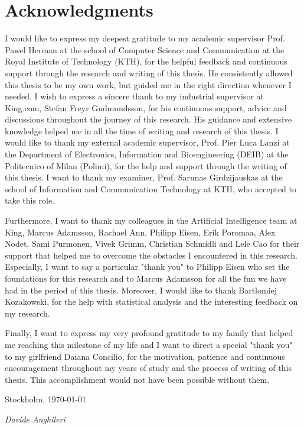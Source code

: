 \chapter*{Acknowledgments}

I would like to express my deepest gratitude to my academic supervisor Prof. Pawel Herman at the school of Computer Science and Communication at the Royal Institute of Technology (KTH), for the helpful feedback and continuous support through the research and writing of this thesis. He consistently allowed this thesis to be my own work, but guided me in the right direction whenever I needed. 
I wish to express a sincere thank to my industrial supervisor at King.com, Stefan Freyr Gudmundsson, for his continuous support, advice and discussions throughout the journey of this research. His guidance and extensive knowledge helped me in all the time of writing and research of this thesis.
I would like to thank my external academic supervisor, Prof. Pier Luca Lanzi at the Department of Electronics, Information and Bioengineering (DEIB) at the Politecnico of Milan (Polimi), for the help and support through the writing of this thesis. 
I want to thank my examiner, Prof. Sarunas Girdzijauskas at the school of Information and Communication Technology at KTH, who accepted to take this role. 

Furthermore, I want to thank my colleagues in the Artificial Intelligence team at King, Marcus Adamsson, Rachael Ann, Philipp Eisen, Erik Poromaa, Alex Nodet, Sami Purmonen, Vivek Grimm, Christian Schmidli and Lele Cao for their support that helped me to overcome the obstacles I encountered in this research. Especially, I want to say a particular "thank you" to Philipp Eisen who set the foundations for this research and to Marcus Adamsson for all the fun we have had in the period of this thesis.
Moreover, I would like to thank Bartlomiej Kozakowski, for the help with statistical analysis and the interesting feedback on my research.

Finally, I want to express my very profound gratitude to my family that helped me reaching this milestone of my life and I want to direct a special "thank you" to my girlfriend Daiana Concilio, for the motivation, patience and continuous encouragement throughout my years of study and the process of writing of this thesis. This accomplishment would not have been possible without them.


\vspace{1.0cm}

\noindent
Stockholm, \today

\noindent
\textit{Davide Anghileri}